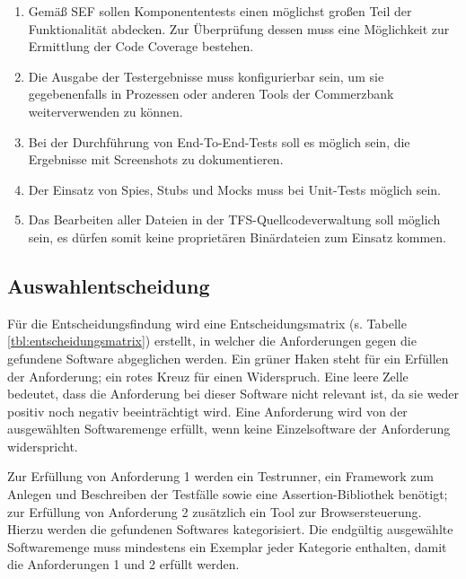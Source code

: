 \begin{enumerate}
	\item Gemäß SEF sollen Komponententests \glqq einen möglichst großen Teil der Funktionalität abdecken\grqq{}\cite{coba-sef}. Zur Überprüfung dessen muss eine Möglichkeit zur Ermittlung der Code Coverage bestehen.
	\item Die Ausgabe der Testergebnisse muss konfigurierbar sein, um sie gegebenenfalls in Prozessen oder anderen Tools der Commerzbank weiterverwenden zu können.
	\item Bei der Durchführung von End-To-End-Tests soll es möglich sein, die Ergebnisse mit Screenshots zu dokumentieren.
	\item Der Einsatz von Spies, Stubs und Mocks muss bei Unit-Tests möglich sein.
	\item Das Bearbeiten aller Dateien in der TFS-Quellcodeverwaltung soll möglich sein, es dürfen somit keine proprietären Binärdateien zum Einsatz kommen.
\end{enumerate}

\newpage


\newpage
\subsection{Auswahlentscheidung}
Für die Entscheidungsfindung wird eine Entscheidungsmatrix (s. Tabelle \ref{tbl:entscheidungsmatrix}) erstellt, in welcher die Anforderungen gegen die gefundene Software abgeglichen werden. Ein grüner Haken steht für ein Erfüllen der Anforderung; ein rotes Kreuz für einen Widerspruch. Eine leere Zelle bedeutet, dass die Anforderung bei dieser Software nicht relevant ist, da sie weder positiv noch negativ beeinträchtigt wird. Eine Anforderung wird von der ausgewählten Softwaremenge erfüllt, wenn keine Einzelsoftware der Anforderung widerspricht.

Zur Erfüllung von Anforderung 1 werden ein Testrunner, ein Framework zum Anlegen und Beschreiben der Testfälle sowie eine Assertion-Bibliothek benötigt; zur Erfüllung von Anforderung 2 zusätzlich ein Tool zur Browsersteuerung. Hierzu werden die gefundenen Softwares  kategorisiert. Die endgültig ausgewählte Softwaremenge muss mindestens ein Exemplar jeder Kategorie enthalten, damit die Anforderungen 1 und 2 erfüllt werden.

